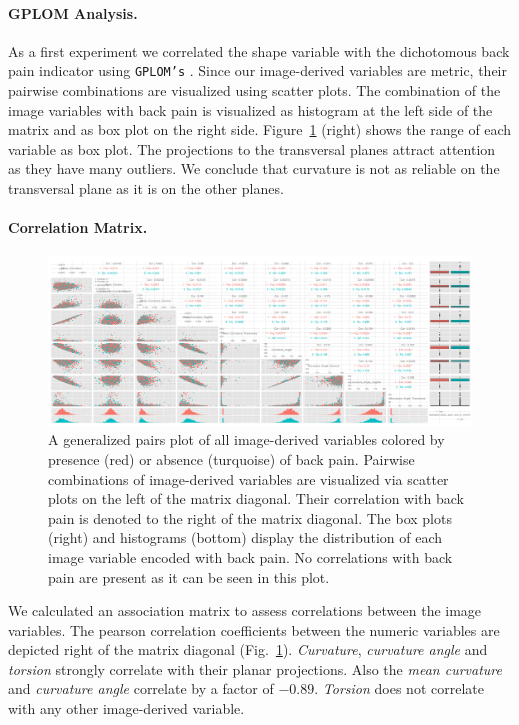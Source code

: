 \documentclass[a4paper,twoside]{style/article}
\begin{document}
\paragraph{GPLOM Analysis.}
As a first experiment we correlated the shape variable with the dichotomous back pain indicator using \texttt{GPLOM's} \cite{GPLOMS}.
Since our image-derived variables are metric, their pairwise combinations are visualized using scatter plots.
The combination of the image variables with back pain is visualized as histogram at the left side of the matrix and as box plot on the right side.
Figure~\ref{fig:image-parameter-range} (right) shows the range of each variable as box plot.
The projections to the transversal planes attract attention as they have many outliers.
We conclude that curvature is not as reliable on the transversal plane as it is on the other planes.
\paragraph{Correlation Matrix.}
\begin{figure}[htb]
  \centering
  \includegraphics[width=1.0\textwidth]{figures/image-parameter-range}
  \caption{%
A generalized pairs plot of all image-derived variables colored by presence (red) or absence (turquoise) of back pain.
Pairwise combinations of image-derived variables are visualized via scatter plots on the left of the matrix diagonal.
Their correlation with back pain is denoted to the right of the matrix diagonal.
The box plots (right) and histograms (bottom) display the distribution of each image variable encoded with back pain.
No correlations with back pain are present as it can be seen in this plot.
}
  \label{fig:image-parameter-range}
\end{figure}
We calculated an association matrix to assess correlations between the image variables.
The pearson correlation coefficients between the numeric variables are depicted right of the matrix diagonal (Fig.~\ref{fig:image-parameter-range}).
\emph{Curvature}, \emph{curvature angle} and \emph{torsion} strongly correlate with their planar projections.
Also the \emph{mean curvature} and \emph{curvature angle} correlate by a factor of $-0.89$.
\emph{Torsion} does not correlate with any other image-derived variable.
\end{document}

